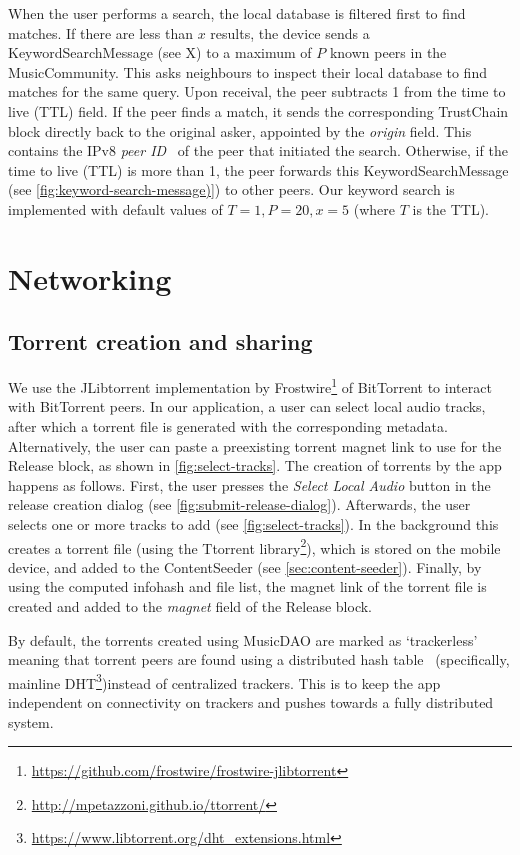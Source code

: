 When the user performs a search, the local database is filtered first to find matches. If there are less than \(x\) results, the device sends a KeywordSearchMessage (see X) to a maximum of \(P\) known peers in the MusicCommunity. This asks neighbours to inspect their local database to find matches for the same query. Upon receival, the peer subtracts 1 from the time to live (TTL) field. If the peer finds a match, it sends the corresponding TrustChain block directly back to the original asker, appointed by the \textit{origin} field. This contains the IPv8 \textit{peer ID}~\citep{mattskala2020} of the peer that initiated the search. Otherwise, if the time to live (TTL) is more than 1, the peer forwards this KeywordSearchMessage (see \ref{fig:keyword-search-message)}) to other peers. Our keyword search is implemented with default values of \(T=1, P=20, x=5\) (where \(T\) is the TTL).

\section{Networking}
\subsection{Torrent creation and sharing}
\label{sec:torrent-creation}
We use the JLibtorrent implementation by Frostwire\footnote{\url{https://github.com/frostwire/frostwire-jlibtorrent}} of BitTorrent to interact with BitTorrent peers. In our application, a user can select local audio tracks, after which a torrent file is generated with the corresponding metadata. Alternatively, the user can paste a preexisting torrent magnet link to use for the Release block, as shown in \ref{fig:select-tracks}. The creation of torrents by the app happens as follows. First, the user presses the \textit{Select Local Audio} button in the release creation dialog (see \ref{fig:submit-release-dialog}). Afterwards, the user selects one or more tracks to add (see \ref{fig:select-tracks}). In the background this creates a torrent file (using the Ttorrent library\footnote{\url{http://mpetazzoni.github.io/ttorrent/}}), which is stored on the mobile device, and added to the ContentSeeder (see \ref{sec:content-seeder}). Finally, by using the computed infohash and file list, the magnet link of the torrent file is created and added to the \textit{magnet} field of the Release block.

By default, the torrents created using MusicDAO are marked as `trackerless' meaning that torrent peers are found using a distributed hash table~\citep{dht2019} (specifically, mainline DHT\footnote{\url{https://www.libtorrent.org/dht_extensions.html}})instead of centralized trackers. This is to keep the app independent on connectivity on trackers and pushes towards a fully distributed system.

